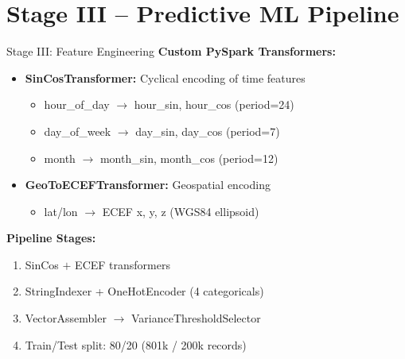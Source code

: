 \documentclass[10pt]{beamer}
\begin{document}
\section{Stage III -- Predictive ML Pipeline}

\begin{frame}{Stage III: Feature Engineering}
\textbf{Custom PySpark Transformers:}
\begin{itemize}
    \item \textbf{SinCosTransformer:} Cyclical encoding of time features
    \begin{itemize}
        \item hour\_of\_day $\rightarrow$ hour\_sin, hour\_cos (period=24)
        \item day\_of\_week $\rightarrow$ day\_sin, day\_cos (period=7)
        \item month $\rightarrow$ month\_sin, month\_cos (period=12)
    \end{itemize}
    \item \textbf{GeoToECEFTransformer:} Geospatial encoding
    \begin{itemize}
        \item lat/lon $\rightarrow$ ECEF x, y, z (WGS84 ellipsoid)
    \end{itemize}
\end{itemize}

\textbf{Pipeline Stages:}
\begin{enumerate}
    \item SinCos $+$ ECEF transformers
    \item StringIndexer + OneHotEncoder (4 categoricals)
    \item VectorAssembler $\rightarrow$ VarianceThresholdSelector
    \item Train/Test split: 80/20 (801k / 200k records)
\end{enumerate}
\end{frame}
\end{document}
